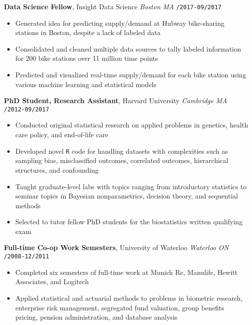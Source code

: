 \documentclass[10pt,english]{report}
\begin{document}
\vspace{1mm}

\textbf{Data Science Fellow}, Insight Data Science \hfill \textit{Boston MA} \texttt{/2017-09/2017}
\begin{itemize}
\item Generated idea for predicting supply/demand at Hubway bike-sharing stations in Boston, despite a lack of labeled data
\item Consolidated and cleaned multiple data sources to tally labeled information for 200 bike stations over 11 million time points
\item Predicted and visualized real-time supply/demand for each bike station using various machine learning and statistical models
\end{itemize}

\vspace{1mm}

\textbf{PhD Student, Research Assistant}, Harvard University \hfill \textit{Cambridge MA} \texttt{/2012-09/2017}
\begin{itemize}
\item Conducted original statistical research on applied problems in genetics, health care policy, and end-of-life care
\item Developed novel \texttt{R} code for handling datasets with complexities such as sampling bias, misclassified outcomes, correlated outcomes, hierarchical structures, and confounding
\item Taught graduate-level labs with topics ranging from introductory statistics to seminar topics in Bayesian nonparametrics, decision theory, and sequential methods
\item Selected to tutor fellow PhD students for the biostatistics written qualifying exam
\end{itemize}

\vspace{1mm}

\textbf{Full-time Co-op Work Semesters}, University of Waterloo \hfill \textit{Waterloo ON} \texttt{/2008-12/2011}
\begin{itemize}
\item Completed six semesters of full-time work at Munich Re, Manulife, Hewitt Associates, and Logitech
\item Applied statistical and actuarial methods to problems in biometric research, enterprise risk management, segregated fund valuation, group benefits pricing, pension administration, and database analysis
\end{itemize}
\end{document}
